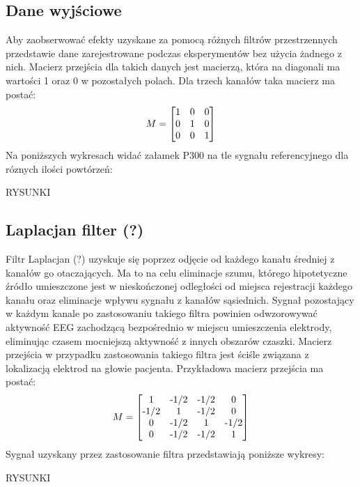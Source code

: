 \documentclass[licencjacka,openright]{pracamgr}
\begin{document}
\subsection{Dane wyjściowe}
Aby zaobserwować efekty uzyskane za pomocą różnych filtrów przestrzennych przedstawie dane zarejestrowane podczas eksperymentów bez użycia żadnego z nich. Macierz przejścia dla takich danych jest macierzą, która na diagonali ma wartości 1 oraz 0 w pozostałych polach.
Dla trzech kanałów taka macierz ma postać:
\[
M =
\begin{bmatrix}
  $1$ & $0$ & $0$ \\
  $0$ & $1$ & $0$ \\
  $0$ & $0$ & $1$ 
\end{bmatrix}
\]
Na poniższych wykresach widać załamek P300 na tle sygnału referencyjnego dla róznych ilości powtórzeń:

RYSUNKI


\subsection{Laplacjan filter (?)}
Filtr Laplacjan (?) uzyskuje się poprzez odjęcie od każdego kanału średniej z kanałów go otaczających. Ma to na celu eliminacje szumu, którego hipotetyczne źródło umieszczone jest w nieskończonej odległości od miejsca rejestracji każdego kanału oraz eliminacje wpływu sygnału z kanałów sąsiednich. Sygnał pozostający w każdym kanale po zastosowaniu takiego filtra powinien odwzorowywać aktywność EEG zachodzącą bezpośrednio w miejscu umieszczenia elektrody, eliminując czasem mocniejszą aktywność z innych obszarów czaszki.
Macierz przejścia w przypadku zastosowania takiego filtra jest ściśle związana z lokalizacją elektrod na głowie pacjenta.
Przykładowa macierz przejścia ma postać:
\[
M =
\begin{bmatrix}
  $1$ & $-1/2$ & $-1/2$ & $0$ \\
  $-1/2$ & $1$ & $-1/2$ & $0$ \\
  $0$ & $-1/2$ & $1$ & $-1/2$ \\
  $0$ & $-1/2$ & $-1/2$ & $1$ 
\end{bmatrix}
\]
Sygnał uzyskany przez zastosowanie filtra przedstawiają poniższe wykresy:

RYSUNKI
\end{document}
